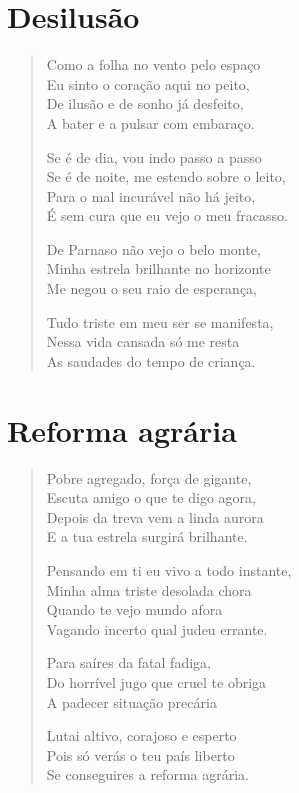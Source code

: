 \chapter{Desilusão}

\begin{verse}
Como a folha no vento pelo espaço\\
Eu sinto o coração aqui no peito,\\
De ilusão e de sonho já desfeito,\\
A bater e a pulsar com embaraço.

Se é de dia, vou indo passo a passo\\
Se é de noite, me estendo sobre o leito,\\
Para o mal incurável não há jeito,\\
É sem cura que eu vejo o meu fracasso.

De Parnaso não vejo o belo monte,\\
Minha estrela brilhante no horizonte\\
Me negou o seu raio de esperança,

Tudo triste em meu ser se manifesta,\\
Nessa vida cansada só me resta\\
As saudades do tempo de criança.
\end{verse}

\chapter{Reforma agrária}

\begin{verse}
Pobre agregado, força de gigante,\\
Escuta amigo o que te digo agora,\\
Depois da treva vem a linda aurora\\
E a tua estrela surgirá brilhante.

Pensando em ti eu vivo a todo instante,\\
Minha alma triste desolada chora\\
Quando te vejo mundo afora\\
Vagando incerto qual judeu errante.

Para saíres da fatal fadiga,\\
Do horrível jugo que cruel te obriga\\
A padecer situação precária

Lutai altivo, corajoso e esperto\\
Pois só verás o teu país liberto\\
Se conseguires a reforma agrária.
\end{verse}

